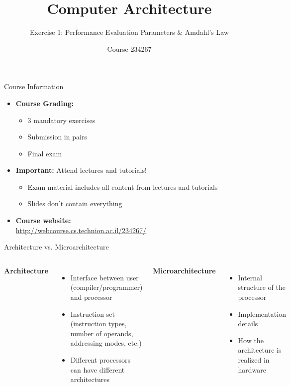 \documentclass[aspectratio=169,12pt]{beamer}
\title{Computer Architecture}
\subtitle{Exercise 1: Performance Evaluation Parameters \& Amdahl's Law}
\author{Course 234267}
\date{}
\begin{document}
\frame{\titlepage}

\begin{frame}{Course Information}
\begin{itemize}
    \item \textbf{Course Grading:}
    \begin{itemize}
        \item 3 mandatory exercises
        \item Submission in pairs
        \item Final exam
    \end{itemize}
    \item \textbf{Important:} Attend lectures and tutorials!
    \begin{itemize}
        \item Exam material includes all content from lectures and tutorials
        \item Slides don't contain everything
    \end{itemize}
    \item \textbf{Course website:}\\
    \url{http://webcourse.cs.technion.ac.il/234267/}
\end{itemize}
\end{frame}

\begin{frame}{Architecture vs. Microarchitecture}
\begin{columns}
\textbf{Architecture}
\begin{itemize}
    \item Interface between user (compiler/programmer) and processor
    \item Instruction set (instruction types, number of operands, addressing modes, etc.)
    \item Different processors can have different architectures
\end{itemize}

\textbf{Microarchitecture}
\begin{itemize}
    \item Internal structure of the processor
    \item Implementation details
    \item How the architecture is realized in hardware
\end{itemize}
\end{columns}
\end{frame}
\end{document}
